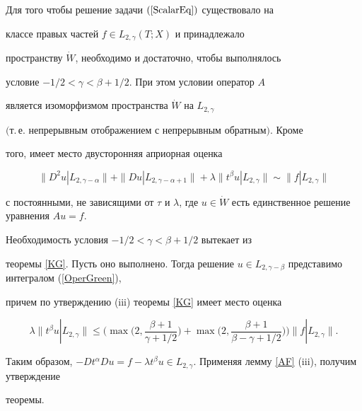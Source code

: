 \begin{thms}\label{SolvScal}


Для того чтобы решение задачи $(\ref{ScalarEq})$ существовало на


классе правых частей $f \in L_{2,\gamma}(T;X)$ и принадлежало


пространству $\Dot{W}$, необходимо и достаточно, чтобы выполнялось


условие $-1/2 < \gamma < \beta+1/2$. При этом условии оператор $A$


является изоморфизмом пространства $\Dot{W}$ на $L_{2,\gamma}$


$($т.\,е. непрерывным отображением  с непрерывным обратным\/$)$. Кроме


того, имеет место двусторонняя априорная оценка


$$


\|D^2 u|L_{2,\gamma-\alpha}\|+


\|D u|L_{2,\gamma-\alpha+1}\| +\lambda \|t^\beta u|L_{2,\gamma}\|


\sim \|f|L_{2,\gamma}\|


$$


с постоянными, не зависящими от $\tau$ и $\lambda$, где $u \in


\Dot{W}$ есть единственное решение уравнения $Au=f$.


\end{thms}








\begin{pf}


Необходимость условия $-1/2 < \gamma < \beta+1/2$ вытекает из


теоремы \ref{KG}. Пусть оно выполнено. Тогда решение $u \in


L_{2,\gamma-\beta}$ представимо интегралом (\ref{OperGreen}),


причем по утверждению (iii) теоремы \ref{KG} имеет место оценка


$$


\lambda \|t^\beta u|L_{2,\gamma}\| \le


\bigg(\max\bigg(2,\frac{\beta+1}{\gamma+1/2}\bigg) +


\max\bigg(2,\frac{\beta+1}{\beta-\gamma+1/2}\bigg)\bigg)\|f|L_{2,\gamma}\|.


$$


Таким образом, $-D t^\alpha Du=f-\lambda t^\beta u \in


L_{2,\gamma}$. Применяя лемму \ref{AF} (iii), получим утверждение


теоремы.


\end{pf}








